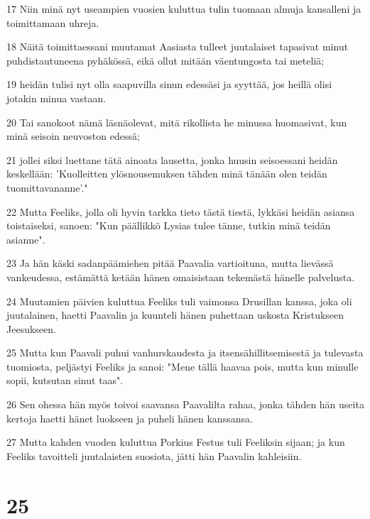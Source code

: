 \par 17 Niin minä nyt useampien vuosien kuluttua tulin tuomaan almuja kansalleni ja toimittamaan uhreja.
\par 18 Näitä toimittaessani muutamat Aasiasta tulleet juutalaiset tapasivat minut puhdistautuneena pyhäkössä, eikä ollut mitään väentungosta tai meteliä;
\par 19 heidän tulisi nyt olla saapuvilla sinun edessäsi ja syyttää, jos heillä olisi jotakin minua vastaan.
\par 20 Tai sanokoot nämä läsnäolevat, mitä rikollista he minussa huomasivat, kun minä seisoin neuvoston edessä;
\par 21 jollei siksi luettane tätä ainoata lausetta, jonka huusin seisoessani heidän keskellään: 'Kuolleitten ylösnousemuksen tähden minä tänään olen teidän tuomittavananne'."
\par 22 Mutta Feeliks, jolla oli hyvin tarkka tieto tästä tiestä, lykkäsi heidän asiansa toistaiseksi, sanoen: "Kun päällikkö Lysias tulee tänne, tutkin minä teidän asianne".
\par 23 Ja hän käski sadanpäämiehen pitää Paavalia vartioituna, mutta lievässä vankeudessa, estämättä ketään hänen omaisistaan tekemästä hänelle palvelusta.
\par 24 Muutamien päivien kuluttua Feeliks tuli vaimonsa Drusillan kanssa, joka oli juutalainen, haetti Paavalin ja kuunteli hänen puhettaan uskosta Kristukseen Jeesukseen.
\par 25 Mutta kun Paavali puhui vanhurskaudesta ja itsensähillitsemisestä ja tulevasta tuomiosta, peljästyi Feeliks ja sanoi: "Mene tällä haavaa pois, mutta kun minulle sopii, kutsutan sinut taas".
\par 26 Sen ohessa hän myös toivoi saavansa Paavalilta rahaa, jonka tähden hän useita kertoja haetti hänet luokseen ja puheli hänen kanssansa.
\par 27 Mutta kahden vuoden kuluttua Porkius Festus tuli Feeliksin sijaan; ja kun Feeliks tavoitteli juutalaisten suosiota, jätti hän Paavalin kahleisiin.

\chapter{25}

